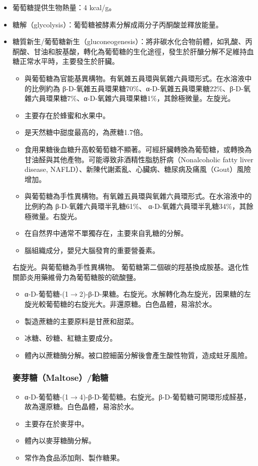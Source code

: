 \documentclass[a4paper,12pt]{report}
\begin{document}
\begin{itemize}
\item 葡萄糖提供生物熱量：4 kcal/g。
\item 糖解（glycolysis）：葡萄糖被酵素分解成兩分子丙酮酸並釋放能量。
\item 糖質新生/葡萄糖新生（gluconeogenesis）：將非碳水化合物前體，如乳酸、丙酮酸、甘油和胺基酸，轉化為葡萄糖的生化途徑，發生於肝醣分解不足維持血糖正常水平時，主要發生於肝臟。
\eit
{}
\begin{itemize}
\item 與葡萄糖為官能基異構物。有氧雜五員環與氧雜六員環形式。在水溶液中的比例約為 β-D-氧雜五員環果糖70\%、α-D-氧雜五員環果糖22\%、β-D-氧雜六員環果糖7\%、α-D-氧雜六員環果糖1\%，其餘極微量。左旋光。
\item 主要存在於蜂蜜和水果中。
\item 是天然糖中甜度最高的，為蔗糖1.7倍。
\item 食用果糖後血糖升高較葡萄糖不顯著。可經肝臟轉換為葡萄糖，或轉換為甘油醛與其他產物。可能導致非酒精性脂肪肝病（Nonalcoholic fatty liver disease, NAFLD）、新陳代謝紊亂、心臟病、糖尿病及痛風（Gout）風險增加。
\end{itemize}
\begin{itemize}
\item 與葡萄糖為手性異構物。有氧雜五員環與氧雜六員環形式。在水溶液中的比例約為 β-D-氧雜六員環半乳糖61\%、 α-D-氧雜六員環半乳糖34\%，其餘極微量。右旋光。
\item 在自然界中通常不單獨存在，主要來自乳糖的分解。
\item 腦組織成分，嬰兒大腦發育的重要營養素。
\end{itemize}
右旋光。與葡萄糖為手性異構物。
葡萄糖第二個碳的羥基換成胺基。退化性關節炎用藥維骨力為葡萄糖胺的硫酸鹽。
\begin{itemize}
\item α-D-葡萄糖-(1$\to$2)-β-D-果糖。右旋光。水解轉化為左旋光，因果糖的左旋光較葡萄糖的右旋光大。非還原糖。白色晶體，易溶於水。
\item 製造蔗糖的主要原料是甘蔗和甜菜。
\item 冰糖、砂糖、紅糖主要成分。
\item 體內以蔗糖酶分解。被口腔細菌分解後會產生酸性物質，造成蛀牙風險。
\end{itemize}
\subsubsection{麥芽糖（Maltose）/飴糖}
\begin{itemize}
\item α-D-葡萄糖-(1$\to$4)-β-D-葡萄糖。右旋光。β-D-葡萄糖可開環形成醛基，故為還原糖。白色晶體，易溶於水。
\item 主要存在於麥芽中。
\item 體內以麥芽糖酶分解。
\item 常作為食品添加劑、製作糖果。
\end{itemize}

\end{itemize}
\end{document}
